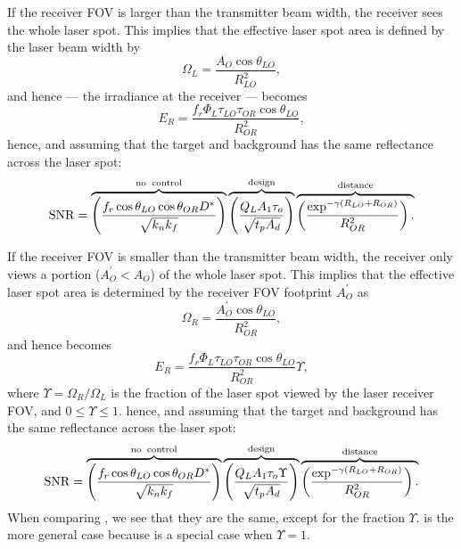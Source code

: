 If the receiver FOV  is larger than the transmitter beam width, the receiver sees the whole laser spot. This implies that the effective laser spot area is defined by the laser beam width by
\begin{equation}
\Omega_L=\frac{A_O\cos\theta_{LO}}{R^2_{LO}},
\end{equation}
and hence  --- the irradiance at the receiver ---  becomes
\begin{equation}
E_R = \frac{
f_r  \Phi_L \tau_{LO}\tau_{OR} \cos\theta_{LO}}{R^2_{OR} }\label{lrfi1}, 
\end{equation}
hence, and assuming that the target and background has the same reflectance across the laser spot:
\begin{equation}
\operatorname{SNR}=
\overbrace{
\left(\frac{f_r \cos\theta_{LO} \cos\theta_{OR} D^\ast }{\sqrt{k_nk_f}}\right)
}^{\rm no\;\;control}
\overbrace{
\left(\frac{Q_L A_1 \tau_o }{\sqrt{t_p A_d}}\right)
}^{\rm design}
\overbrace{
\left(\frac{\exp^{-\gamma (R_{LO}+R_{OR})} }{R^2_{OR}}\right).\\
}^{\rm distance}
\label{lrfd2d}
\end{equation}


If the receiver FOV is smaller than the transmitter beam width, the receiver only views a portion ($A_O^\prime<A_O$) of the whole laser spot. This implies that the effective laser spot area is determined by the receiver FOV footprint  $A_O^\prime$ as 
\begin{equation}
\Omega_R=\frac{A_O^\prime\cos\theta_{LO}}{R^2_{OR}},
\label{eq:lrfFOVsmaller}
\end{equation}
and hence  becomes
\begin{equation}
E_R = \frac{
f_r \Phi_L \tau_{LO}\tau_{OR} \cos\theta_{LO}}{R^2_{OR} }\Upsilon , %
\label{lrfi2}
\end{equation}
where $\Upsilon =\Omega_R/\Omega_L$ is the fraction of the laser spot
viewed by the laser receiver FOV, and $0\leq\Upsilon\leq 1$. 
hence, and assuming that the target and background has the same reflectance across the laser spot:
\begin{equation}
\operatorname{SNR}=
\overbrace{
\left(\frac{f_r  \cos\theta_{LO} \cos\theta_{OR} D^\ast }{\sqrt{k_nk_f}}\right)
}^{\rm no\;\;control}
\overbrace{
\left(\frac{Q_L A_1 \tau_o \Upsilon}{\sqrt{t_p A_d}}\right)
}^{\rm design}
\overbrace{
\left(\frac{\exp^{-\gamma (R_{LO}+R_{OR})} }{R^2_{OR}}\right).\\
}^{\rm distance}
\label{lrfd2e}
\end{equation}
When comparing
, we see that they are the same, except
for the fraction $\Upsilon$.  is the more general case
because  is a special case when $\Upsilon=1$.



